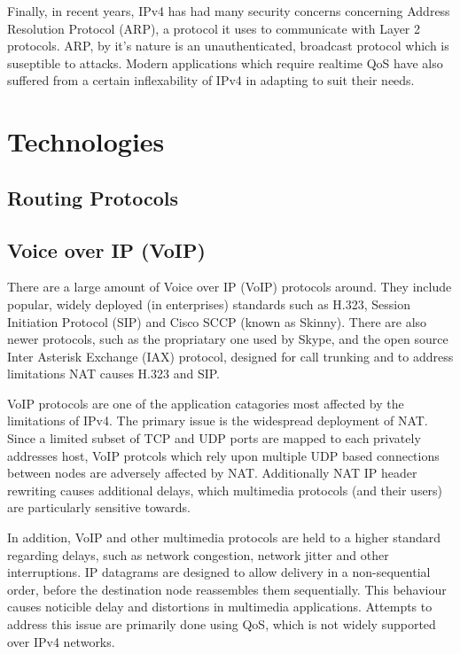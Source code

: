 \documentclass[a4paper,12pt]{article}
\begin{document}
Finally, in recent years, IPv4 has had many security concerns concerning
Address Resolution Protocol (ARP), a protocol it uses to communicate
with Layer 2 protocols. ARP, by it's nature is an unauthenticated, 
broadcast protocol which is suseptible to attacks. Modern applications
which require realtime QoS have also suffered from a certain
inflexability of IPv4 in adapting to suit their needs.

\section{Technologies}

\subsection{Routing Protocols}


\subsection{Voice over IP (VoIP)}

There are a large amount of Voice over IP (VoIP) protocols around. They
include popular, widely deployed (in enterprises) standards such as 
H.323, Session Initiation Protocol (SIP) and Cisco SCCP (known as
Skinny). There are also newer protocols, such as the propriatary one used
by Skype, and the open source Inter Asterisk Exchange (IAX) protocol,
designed for call trunking and to address limitations NAT causes H.323
and SIP.


VoIP protocols are one of the application catagories most affected by
the limitations of IPv4. The primary issue is the widespread deployment
of NAT. Since a limited subset of TCP and UDP ports are mapped to each
privately addresses host, VoIP protcols which rely upon multiple UDP
based connections between nodes are adversely affected by NAT.
Additionally NAT IP header rewriting causes additional delays, which 
multimedia protocols (and their users) are particularly sensitive 
towards.


In addition, VoIP and other multimedia protocols are held to a higher
standard regarding delays, such as network congestion, network jitter 
and other interruptions. IP datagrams are designed to allow delivery 
in a non-sequential order, before the destination node reassembles them
sequentially. This behaviour causes noticible delay and distortions in 
multimedia applications. Attempts to address this issue are primarily
done using QoS, which is not widely supported over IPv4 networks.
\end{document}
